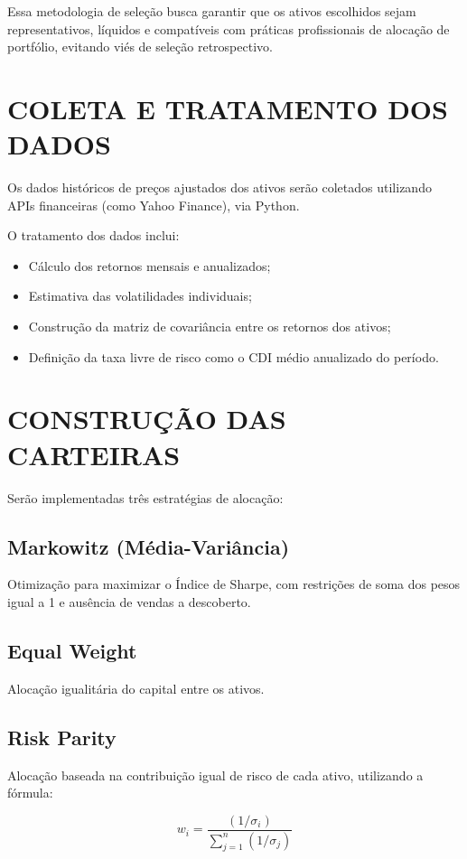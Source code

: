 Essa metodologia de seleção busca garantir que os ativos escolhidos sejam representativos, líquidos e compatíveis com práticas profissionais de alocação de portfólio, evitando viés de seleção retrospectivo.

\section{COLETA E TRATAMENTO DOS DADOS}

Os dados históricos de preços ajustados dos ativos serão coletados utilizando APIs financeiras (como Yahoo Finance), via Python.

O tratamento dos dados inclui:

\begin{itemize}
    \item Cálculo dos retornos mensais e anualizados;
    \item Estimativa das volatilidades individuais;
    \item Construção da matriz de covariância entre os retornos dos ativos;
    \item Definição da taxa livre de risco como o CDI médio anualizado do período.
\end{itemize}

\section{CONSTRUÇÃO DAS CARTEIRAS}

Serão implementadas três estratégias de alocação:

\subsection{Markowitz (Média-Variância)}
Otimização para maximizar o Índice de Sharpe, com restrições de soma dos pesos igual a 1 e ausência de vendas a descoberto.

\subsection{Equal Weight}
Alocação igualitária do capital entre os ativos.

\subsection{Risk Parity}
Alocação baseada na contribuição igual de risco de cada ativo, utilizando a fórmula:

\begin{equation}
w_i = \frac{(1/\sigma_i)}{\sum_{j=1}^{n}(1/\sigma_j)}
\end{equation}

